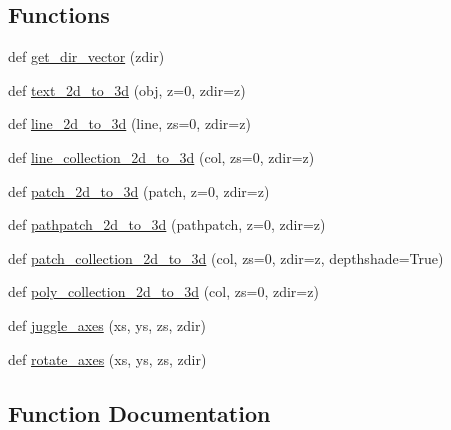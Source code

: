 \subsection*{Functions}
\begin{DoxyCompactItemize}
\item 
def \hyperlink{namespacemplot3d_1_1art3d_af8006fadbd6eb70fb551e3b82205591d}{get\+\_\+dir\+\_\+vector} (zdir)
\item 
def \hyperlink{namespacemplot3d_1_1art3d_a840e0bb22665293a0de891ffeb8f7d77}{text\+\_\+2d\+\_\+to\+\_\+3d} (obj, z=0, zdir=\textquotesingle{}z\textquotesingle{})
\item 
def \hyperlink{namespacemplot3d_1_1art3d_ab5414deecc5c73ab6130fee1cbd5528f}{line\+\_\+2d\+\_\+to\+\_\+3d} (line, zs=0, zdir=\textquotesingle{}z\textquotesingle{})
\item 
def \hyperlink{namespacemplot3d_1_1art3d_a1d140cd224fc1c70909b879baf17eac2}{line\+\_\+collection\+\_\+2d\+\_\+to\+\_\+3d} (col, zs=0, zdir=\textquotesingle{}z\textquotesingle{})
\item 
def \hyperlink{namespacemplot3d_1_1art3d_aaa3aaa8baa36dfff3aed3f84dc126aa5}{patch\+\_\+2d\+\_\+to\+\_\+3d} (patch, z=0, zdir=\textquotesingle{}z\textquotesingle{})
\item 
def \hyperlink{namespacemplot3d_1_1art3d_a7535eb7d41ebf54ac9eb7d90c1412c3a}{pathpatch\+\_\+2d\+\_\+to\+\_\+3d} (pathpatch, z=0, zdir=\textquotesingle{}z\textquotesingle{})
\item 
def \hyperlink{namespacemplot3d_1_1art3d_adda6f5823961c62812d0ac5dedabf63e}{patch\+\_\+collection\+\_\+2d\+\_\+to\+\_\+3d} (col, zs=0, zdir=\textquotesingle{}z\textquotesingle{}, depthshade=True)
\item 
def \hyperlink{namespacemplot3d_1_1art3d_aec62e64d4d408e7099b314aba960ad18}{poly\+\_\+collection\+\_\+2d\+\_\+to\+\_\+3d} (col, zs=0, zdir=\textquotesingle{}z\textquotesingle{})
\item 
def \hyperlink{namespacemplot3d_1_1art3d_ab3ce3a08ef64e17416f8ed492862e739}{juggle\+\_\+axes} (xs, ys, zs, zdir)
\item 
def \hyperlink{namespacemplot3d_1_1art3d_af7d66f4517b1fa207956e9ec72ab26d1}{rotate\+\_\+axes} (xs, ys, zs, zdir)
\end{DoxyCompactItemize}


\subsection{Function Documentation}
\mbox{\label{namespacemplot3d_1_1art3d_af8006fadbd6eb70fb551e3b82205591d}} 
